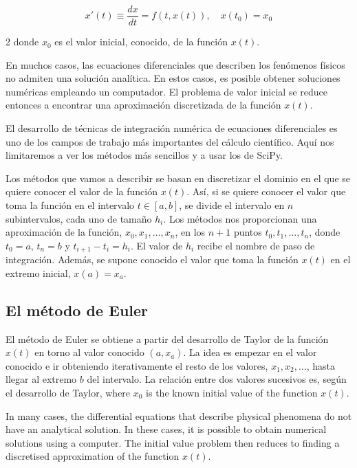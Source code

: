\begin{equation*}
x'(t)\equiv \frac{dx}{dt}=f(t,x(t)), \quad x(t_0)=x_0
\end{equation*}
\begin{paracol}{2}
donde $x_0$ es el valor inicial, conocido, de la función $x(t)$.

En muchos casos, las ecuaciones diferenciales que describen los fenómenos físicos no admiten una solución analítica. En estos casos, es posible obtener soluciones numéricas empleando un computador. El problema de valor inicial se reduce entonces a encontrar una aproximación discretizada de la función $x(t)$.

El desarrollo de técnicas de integración nu\-mérica de ecuaciones diferenciales es uno de los campos de trabajo más importantes del cálculo científico. Aquí nos limitaremos a ver los métodos más sencillos y a usar los de SciPy.

Los métodos que vamos a describir se basan en discretizar el dominio en el que se quiere conocer el valor de la función $x(t)$. Así, si se quiere conocer el valor que toma la función en el intervalo $t \in [a,b]$, se divide el intervalo en $n$ subintervalos, cada uno de tamaño $h_i$. Los métodos nos proporcionan una aproximación de la función, $x_0,x_1,\dots, x_n$, en los $n+1$ puntos $t_0,t_1,\dots, t_n$, donde $t_0=a$, $t_n=b$ y $t_{i+1}-t_i=h_i$. El valor de $h_i$ recibe el nombre de paso de integración. Además, se supone conocido el valor que toma la función $x(t)$ en el extremo inicial, $x(a)=x_a$.

\subsection{El método de Euler}
El método de Euler se obtiene a partir del desarrollo de Taylor de la función $x(t)$ en torno al valor conocido $(a,x_a)$. La idea es empezar en el valor conocido e ir obteniendo iterativamente el resto de los valores, $x_1,x_2,\dots$, hasta llegar al extremo $b$ del intervalo. La relación entre dos valores sucesivos es, según el desarrollo de Taylor, 
\switchcolumn
where $x_0$ is the known initial value of the function $x(t)$.

In many cases, the differential equations that describe physical phenomena do not have an analytical solution. In these cases, it is possible to obtain numerical solutions using a computer. The initial value problem then reduces to finding a discretised approximation of the function $x(t)$.


\end{paracol}
